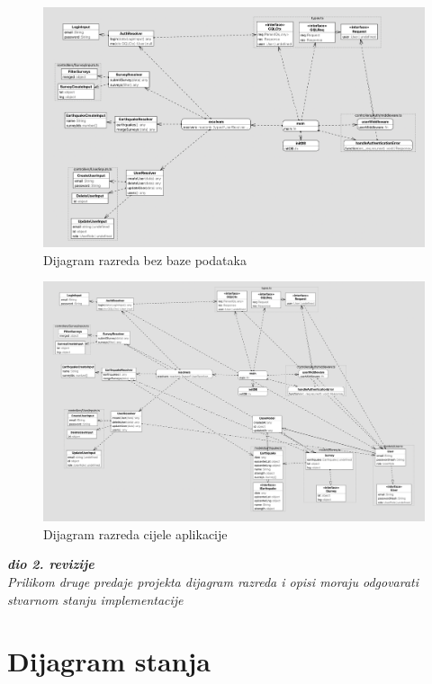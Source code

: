 			\begin{figure}[H]
				\includegraphics[width=\textwidth]{slike/classdiagram_no_db.png} 
				\caption{Dijagram razreda bez baze podataka}
				\label{fig:uml_no_db} 
			\end{figure}

			\begin{figure}[H]
				\includegraphics[width=\textwidth]{slike/classDiagram.png} 
				\caption{Dijagram razreda cijele aplikacije}
				\label{fig:uml} 
			\end{figure}

			\textbf{\textit{dio 2. revizije}}\\			
			
			\textit{Prilikom druge predaje projekta dijagram razreda i opisi moraju odgovarati stvarnom stanju implementacije}
			
			
			
			
			\eject
		
		\section{Dijagram stanja}
			
